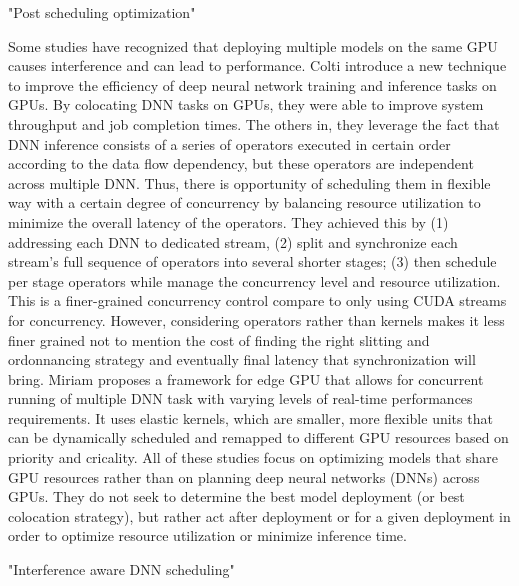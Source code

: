 "Post scheduling optimization"

Some studies have recognized that deploying multiple models on the same GPU causes interference and can lead to performance. Colti introduce a new technique to improve the efficiency of deep neural network training and inference tasks on GPUs. By colocating DNN tasks on GPUs, they were able to improve system throughput and job completion times.
The others in, they leverage the fact that DNN inference consists of a series of operators executed in certain order according to the data flow dependency, but these operators are independent across multiple DNN. Thus, there is opportunity of scheduling them in flexible way with a certain degree of concurrency by balancing resource utilization to minimize the overall latency of the operators. They achieved this by (1) addressing each DNN to dedicated stream, (2) split and synchronize each stream's full sequence of operators into several shorter stages; (3) then schedule per stage operators while manage the concurrency level and resource utilization. This is a finer-grained concurrency control compare to only using CUDA streams for concurrency. However, considering operators rather than kernels makes it less finer grained not to mention the cost of finding the right slitting and ordonnancing strategy and eventually final latency that synchronization will bring.
Miriam proposes a framework for edge GPU that allows for concurrent running of multiple DNN task with varying levels of real-time performances requirements. It uses elastic kernels, which are smaller, more flexible units that can be dynamically scheduled and remapped to different GPU resources based on priority and cricality.
All of these studies focus on optimizing models that share GPU resources rather than on planning deep neural networks (DNNs) across GPUs. They do not seek to determine the best model deployment (or best colocation strategy), but rather act after deployment or for a given deployment in order to optimize resource utilization or minimize inference time.

"Interference aware DNN scheduling"

